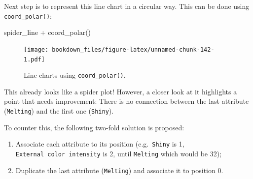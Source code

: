 \documentclass[
]{krantz}
\makeatletter
\newenvironment{Shaded}{\begin{snugshade}}{\end{snugshade}}
\newcommand{\AttributeTok}[1]{\textcolor[rgb]{0.61,0.61,0.61}{#1}}
\newcommand{\DecValTok}[1]{\textcolor[rgb]{0.06,0.06,0.06}{#1}}
\newcommand{\FunctionTok}[1]{\textcolor[rgb]{0,0,0}{#1}}
\newcommand{\NormalTok}[1]{#1}
\newcommand{\OtherTok}[1]{\textcolor[rgb]{0.37,0.37,0.37}{#1}}
\newcommand{\SpecialCharTok}[1]{\textcolor[rgb]{0,0,0}{#1}}
\newcommand{\StringTok}[1]{\textcolor[rgb]{0.5,0.5,0.5}{#1}}
\providecommand{\tightlist}{%
  \setlength{\itemsep}{0pt}\setlength{\parskip}{0pt}}
\newenvironment{kframe}{%
\medskip{}
\setlength{\fboxsep}{.8em}
 \def\at@end@of@kframe{}%
 \ifinner\ifhmode%
  \def\at@end@of@kframe{\end{minipage}}%
  \begin{minipage}{\columnwidth}%
 \fi\fi%
 \def\FrameCommand##1{\hskip\@totalleftmargin \hskip-\fboxsep
 \colorbox{shadecolor}{##1}\hskip-\fboxsep
     \hskip-\linewidth \hskip-\@totalleftmargin \hskip\columnwidth}%
 \MakeFramed {\advance\hsize-\width
   \@totalleftmargin\z@ \linewidth\hsize
   \@setminipage}}%
 {\par\unskip\endMakeFramed%
 \at@end@of@kframe}
\renewenvironment{Shaded}{\begin{kframe}}{\end{kframe}}
\makeatother
\begin{document}
Next step is to represent this line chart in a circular way. This can be done using \texttt{coord\_polar()}:

\begin{Shaded}
\begin{Highlighting}[]
\NormalTok{spider\_line }\SpecialCharTok{+} \FunctionTok{coord\_polar}\NormalTok{()}
\end{Highlighting}
\end{Shaded}

\begin{figure}
\centering
\texttt{[image: bookdown\_files/figure-latex/unnamed-chunk-142-1.pdf]}
\caption{\label{fig:unnamed-chunk-142}Line charts using \texttt{coord\_polar()}.}
\end{figure}

This already looks like a spider plot! However, a closer look at it highlights a point that needs improvement: There is no connection between the last attribute (\texttt{Melting}) and the first one (\texttt{Shiny}).

To counter this, the following two-fold solution is proposed:

\begin{enumerate}
\def\labelenumi{\arabic{enumi}.}
\tightlist
\item
  Associate each attribute to its position (e.g.~\texttt{Shiny} is 1, \texttt{External\ color\ intensity} is 2, until \texttt{Melting} which would be 32);
\item
  Duplicate the last attribute (\texttt{Melting}) and associate it to position 0.
\end{enumerate}

\begin{Shaded}
\end{Shaded}
\end{document}
